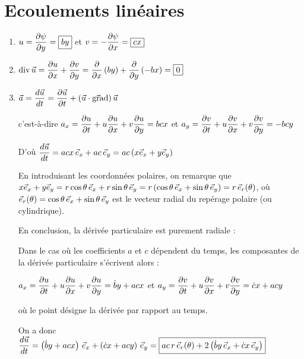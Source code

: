 \documentclass[10pt, a4paper]{article}
\renewcommand{\myvec}[1]{\vec{#1}}
\begin{document}
\section{Ecoulements linéaires}

\begin{enumerate}
\item
$u = \displaystyle \frac{\partial \psi}{\partial y} = \fbox{$by$}$ et $v = -\displaystyle \frac{\partial \psi}{\partial x} = \fbox{$cx$}$

\item
$\divergence \myvec{u} 
= \dpdx{u} + \dpdy{v} 
= \dpdx{}\left ( by \right) + \dpdy{}\left ( -bx \right)
= \fbox{$0$}$

\item
$\myvec{a} = \ddt{\myvec{u}} 
= \dpdt{\myvec{u}} + \left ( \myvec{u} \cdot \gradient \right ) \myvec{u}$

\medskip
c'est-à-dire 
\dotfill $a_x = \displaystyle \frac{\partial u}{\partial t} + u \displaystyle \frac{\partial u}{\partial x} + v \displaystyle \frac{\partial u}{\partial y} = bcx$
et $a_y = \displaystyle \frac{\partial v}{\partial t} + u \displaystyle \frac{\partial v}{\partial x} + v \displaystyle \frac{\partial v}{\partial y} = -bcy$

\medskip
D'où \dotfill 
$\ddt{\myvec{u}} 
= ac x \, \ex+ ac \, \ey 
= ac \left (  x \ex + y\ey \right)$

\medskip
En introduisant les coordonnées polaires, on remarque que
$x \ex + y\ey 
= r\cos \theta \, \ex  + r\sin \theta \, \ey
= r \left (\cos \theta \, \ex  + \sin \theta \, \ey \right )
= r \, \er(\theta)$, où $\er(\theta) = \cos \theta \, \ex  + \sin \theta \, \ey$ est le vecteur radial du repérage polaire (ou cylindrique).

\medskip
En conclusion, la dérivée particulaire est purement radiale :
\dotfill
\fbox{$\ddt{\myvec{u}} = ac \, r\, \er(\theta)$}

\medskip
Dans le cas où les coefficients $a$ et $c$ dépendent du temps, les composantes de la dérivée particulaire s'écrivent alors :

\medskip
$a_x = \displaystyle \frac{\partial u}{\partial t} + u \displaystyle \frac{\partial u}{\partial x} + v \displaystyle \frac{\partial u}{\partial y} = \dot{b}y+acx$
\; et \;  
$a_y = \displaystyle \frac{\partial v}{\partial t} + u \displaystyle \frac{\partial v}{\partial x} + v \displaystyle \frac{\partial v}{\partial y} = \dot{c}x+acy$

où le point désigne la dérivée par rapport au temps.

\medskip
On a donc 
$\ddt{\myvec{u}} 
= \left ( \dot{b}y +ac x \right ) \, \ex 
+ \left ( \dot{c}x  +ac y \right ) \, \ey 
= \fbox{$ac \, r\, \er(\theta) 
+ 2 \left ( \dot{b}y \, \ex + \dot{c}x \, \ey \right )$}$


\end{enumerate}
\end{document}
